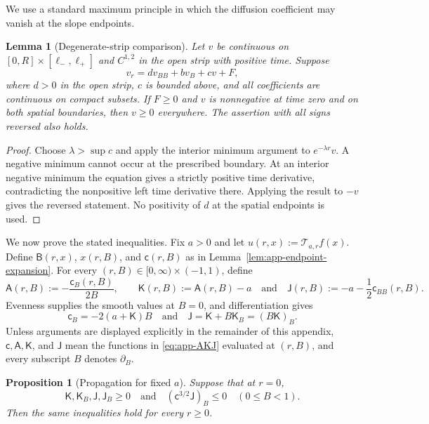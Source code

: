 \documentclass[10pt]{amsart}
\newtheorem{proposition}[proposition]{Proposition}
\newtheorem{lemma}[lemma]{Lemma}
\theoremstyle{definition}
\theoremstyle{remark}
\numberwithin{equation}{section}
\newcommand{\1}{\mathbf 1}
\begin{document}
We use a standard maximum principle in which the diffusion coefficient may vanish at the slope endpoints.

\begin{lemma}[Degenerate-strip comparison]
\label{lem:app-comparison}
Let $v$ be continuous on $[0,R]\times[\ell_-,\ell_+]$ and $C^{1,2}$ in the open strip with positive time.  Suppose
\begin{equation*}
 v_r=dv_{BB}+bv_B+cv+F,
\end{equation*}
where $d>0$ in the open strip, $c$ is bounded above, and all coefficients are continuous on compact subsets.  If $F\geq0$ and $v$ is nonnegative at time zero and on both spatial boundaries, then $v\geq0$ everywhere.  The assertion with all signs reversed also holds.
\end{lemma}

\begin{proof}
Choose $\lambda>\sup c$ and apply the interior minimum argument to $e^{-\lambda r}v$.  A negative minimum cannot occur at the prescribed boundary.  At an interior negative minimum the equation gives a strictly positive time derivative, contradicting the nonpositive left time derivative there.  Applying the result to $-v$ gives the reversed statement.  No positivity of $d$ at the spatial endpoints is used.
\end{proof}

We now prove the stated inequalities. Fix $a>0$ and let $u(r,x):=\mathcal T_{a,r}f(x)$. Define $\mathsf B(r,x)$, $x(r,B)$, and $\mathsf c(r,B)$ as in Lemma~\ref{lem:app-endpoint-expansion}. For every $(r,B)\in[0,\infty)\times(-1,1)$, define
\begin{equation}
 \mathsf A(r,B):=-\frac{\mathsf c_B(r,B)}{2B},\qquad \mathsf K(r,B):=\mathsf A(r,B)-a
 \quad\text{and}\quad \mathsf J(r,B):=-a-\frac12\mathsf c_{BB}(r,B).
 \label{eq:app-AKJ}
\end{equation}
Evenness supplies the smooth values at $B=0$, and differentiation gives
\begin{equation}
 \mathsf c_B=-2(a+\mathsf K)B\quad\text{and}\quad
 \mathsf J=\mathsf K+B\mathsf K_B=(B\mathsf K)_B.
 \label{eq:app-KJ-identities}
\end{equation}
Unless arguments are displayed explicitly in the remainder of this appendix, $\mathsf c,\mathsf A,\mathsf K$, and $\mathsf J$ mean the functions in \eqref{eq:app-AKJ} evaluated at $(r,B)$, and every subscript $B$ denotes $\partial_B$.

\begin{proposition}[Propagation for fixed $a$]
\label{prop:app-fixed-parameter}
Suppose that at $r=0$,
\begin{equation}
 \mathsf K,\mathsf K_B,\mathsf J,\mathsf J_B\geq0\quad\text{and}\quad (\mathsf c^{3/2}\mathsf J)_B\leq0
 \quad(0\leq B<1).
 \label{eq:app-initial-inequalities}
\end{equation}
Then the same inequalities hold for every $r\geq0$.
\end{proposition}
\end{document}
